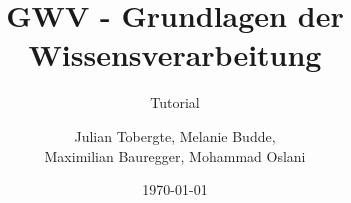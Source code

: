 \documentclass[DIV=12,numbers=noenddot]{scrartcl}
\title{GWV - Grundlagen der Wissensverarbeitung}
\subtitle{Tutorial \arabic{blatt}}
\author{Julian Tobergte, Melanie Budde,\\Maximilian Bauregger, Mohammad Oslani}
\date{\today}
\begin{document}
	\maketitle
	\section{}
		\subsection{}
			\subsubsection{}
\end{document}
